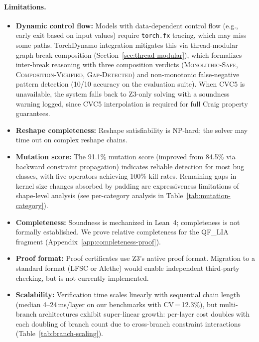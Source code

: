 \documentclass[11pt]{article}
\begin{document}
\paragraph{Limitations.}
\begin{itemize}[leftmargin=2em]
  \item \textbf{Dynamic control flow:} Models with data-dependent
    control flow (e.g., early exit based on input values) require
    \texttt{torch.fx} tracing, which may miss some paths.
    TorchDynamo integration mitigates this via thread-modular
    graph-break composition (Section~\ref{sec:thread-modular}),
    which formalizes inter-break reasoning with three composition
    verdicts (\textsc{Monolithic-Safe}, \textsc{Composition-Verified},
    \textsc{Gap-Detected}) and non-monotonic false-negative pattern
    detection (10/10 accuracy on the evaluation suite).
    When CVC5 is unavailable, the system
    falls back to Z3-only solving with a soundness warning logged,
    since CVC5 interpolation is required for full Craig property
    guarantees.
  \item \textbf{Reshape completeness:} Reshape satisfiability is
    NP-hard; the solver may time out on complex reshape chains.
  \item \textbf{Mutation score:} The 91.1\% mutation score (improved
    from 84.5\% via backward constraint propagation) indicates
    reliable detection for most bug classes, with five operators
    achieving 100\% kill rates.  Remaining gaps
    in kernel size changes absorbed by
    padding are expressiveness limitations of shape-level analysis
    (see per-category analysis in
    Table~\ref{tab:mutation-category}).
  \item \textbf{Completeness:} Soundness is mechanized in Lean~4;
    completeness is not formally established. We prove relative
    completeness for the QF\_LIA fragment
    (Appendix~\ref{app:completeness-proof}).
  \item \textbf{Proof format:} Proof certificates use Z3's native
    proof format.  Migration to a standard format (LFSC or Alethe)
    would enable independent third-party checking, but is not
    currently implemented.
  \item \textbf{Scalability:} Verification time scales linearly
    with sequential chain length (median 4--24\,ms/layer on our benchmarks
    with CV\,=\,12.3\%), but multi-branch architectures exhibit
    super-linear growth: per-layer cost doubles with each doubling
    of branch count due to cross-branch constraint interactions
    (Table~\ref{tab:branch-scaling}).

\end{itemize}
\end{document}

